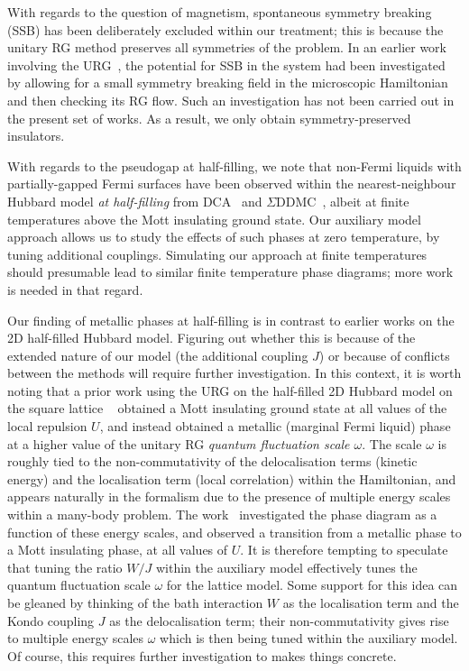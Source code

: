 With regards to the question of magnetism, spontaneous symmetry breaking (SSB) has been deliberately excluded within our treatment; this is because the unitary RG method preserves all symmetries of the problem. In an earlier work involving the URG~\cite{anirbanmott2}, the potential for SSB in the system had been investigated by allowing for a small symmetry breaking field in the microscopic Hamiltonian and then checking its RG flow. Such an investigation has not been carried out in the present set of works. As a result, we only obtain symmetry-preserved insulators.

	\par With regards to the pseudogap at half-filling, we note that non-Fermi liquids with partially-gapped Fermi surfaces have been observed within the nearest-neighbour Hubbard model {\it at half-filling} from DCA~\cite{werner2009momentum} and $\Sigma$DDMC~\cite{simkovic_2020}, albeit at finite temperatures above the Mott insulating ground state. Our auxiliary model approach allows us to study the effects of such phases at zero temperature, by tuning additional couplings. Simulating our approach at finite temperatures should presumable lead to similar finite temperature phase diagrams; more work is needed in that regard.

	Our finding of metallic phases at half-filling is in contrast to earlier works on the 2D half-filled Hubbard model. Figuring out whether this is because of the extended nature of our model (the additional coupling \(J\)) or because of conflicts between the methods will require further investigation. In this context, it is worth noting that a prior work using the URG on the half-filled 2D Hubbard model on the square lattice ~\cite{anirbanmott1} obtained a Mott insulating ground state at all values of the local repulsion \(U\), and instead obtained a metallic (marginal Fermi liquid) phase at a higher value of the unitary RG {\it quantum fluctuation scale $\omega$}. The scale \(\omega\) is roughly tied to the non-commutativity of the delocalisation terms (kinetic energy) and the localisation term (local correlation) within the Hamiltonian, and appears naturally in the formalism due to the presence of multiple energy scales within a many-body problem. The work~\cite{anirbanmott1} investigated the phase diagram as a function of these energy scales, and observed a transition from a metallic phase to a Mott insulating phase, at all values of \(U\). It is therefore tempting to speculate that tuning the ratio \(W/J\) within the auxiliary model effectively tunes the quantum fluctuation scale \(\omega\) for the lattice model. Some support for this idea can be gleaned by thinking of the bath interaction \(W\) as the localisation term and the Kondo coupling \(J\) as the delocalisation term; their non-commutativity gives rise to multiple energy scales \(\omega\) which is then being tuned within the auxiliary model. Of course, this requires further investigation to makes things concrete.

